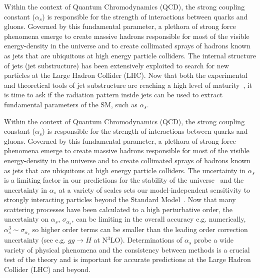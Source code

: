 
Within the context of Quantum Chromodynamics (QCD), the strong coupling constant ($\alpha_s$) is responsible for the strength of interactions between quarks and gluons.  Governed by this fundamental parameter, a plethora of strong force phenomena emerge to create massive hadrons responsible for most of the visible energy-density in the universe and to create collimated sprays of hadrons known as jets that are ubiquitous at high energy particle colliders.  The internal structure of jets (jet substructure) has been extensively exploited to search for new particles at the Large Hadron Collider (LHC).  Now that both the experimental and theoretical tools of jet substructure are reaching a high level of maturity~\cite{Abdesselam:2010pt,Altheimer:2012mn,Altheimer:2013yza,Adams:2015hiv,Larkoski:2017jix}, it is time to ask if the radiation pattern inside jets can be used to extract fundamental parameters of the SM, such as $\alpha_s$.


Within the context of Quantum Chromodynamics (QCD), the strong
coupling constant ($\alpha_s$) is responsible for the strength of
interactions between quarks and gluons.  Governed by this fundamental
parameter, a plethora of strong force phenomena emerge to create
massive hadrons responsible for most of the visible energy-density in
the universe and to create collimated sprays of hadrons known as jets
that are ubiquitous at high energy particle colliders.  The
uncertainty in $\alpha_s$ is a limiting factor in our predictions for
the stability of the universe~\cite{Andreassen:2017rzq} and the
uncertainty in $\alpha_s$ at a variety of scales sets our
model-independent sensitivity to strongly interacting particles beyond
the Standard Model~\cite{Kaplan:2008pt,Becciolini:2014lya}.  Now that
many scattering processes have been calculated to a high perturbative
order, the uncertainty on $\alpha_s$, $\sigma_{\alpha_s}$, can be
limiting in the overall accuracy e.g. numerically,
$\alpha_s^3\sim \sigma_{\alpha_s}$ so higher order terms can be
smaller than the leading order correction uncertainty (see
e.g. $gg\rightarrow H$ at N$^3$LO).  Determinations of $\alpha_s$
probe a wide variety of physical phenomena and the consistency between
methods is a crucial test of the theory and is important for accurate
predictions at the Large Hadron Collider (LHC) and beyond.


